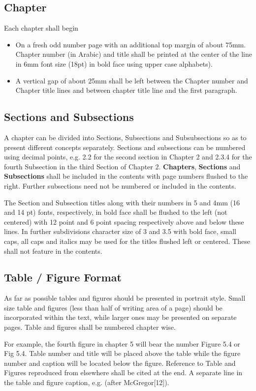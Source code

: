 \subsection{Chapter}
Each chapter shall begin
\begin{itemize}
	\item On a fresh odd number page with an additional top margin of about 75mm. Chapter number (in Arabic) and title shall be printed at the center of the line in 6mm font size (18pt) in bold face using upper case alphabets).
	\item A vertical gap of about 25mm shall be left between the Chapter number and Chapter title lines and between chapter title line and the first paragraph.
\end{itemize}
 
 \subsection{Sections and Subsections}
 A chapter can be divided into Sections, Subsections and Subsubsections so as to present different concepts separately. Sections and subsections can be numbered using decimal points, e.g. 2.2 for the second section in Chapter 2 and 2.3.4 for the fourth Subsection in the third Section of Chapter 2. \textbf{Chapters}, \textbf{Sections} and \textbf{Subsections} shall be included in the contents with page numbers flushed to the right. Further subsections need not be numbered or included in the contents. 
 \par The Section and Subsection titles along with their numbers in 5 and 4mm (16 and 14 pt) fonts, respectively, in bold face shall be flushed to the left (not centered) with 12 point and 6 point spacing respectively above and below these lines. In further subdivisions character size of 3 and 3.5 with bold face, small caps, all caps and italics may be used for the titles flushed left or centered. These shall not feature in the contents.

\subsection{Table / Figure Format}

As far as possible tables and figures should be presented in portrait style. Small size table and figures (less than half of writing area of a page) should be incorporated within the text, while larger ones may be presented on separate pages. Table and figures shall be numbered chapter wise.
\par For example, the fourth figure in chapter 5 will bear the number Figure 5.4 or Fig 5.4. Table number and title will be placed above the table while the figure number and caption will be located below the figure. Reference to Table and Figures reproduced from elsewhere shall be cited at the end. A separate line in the table and figure caption, e.g. (after McGregor[12]).
